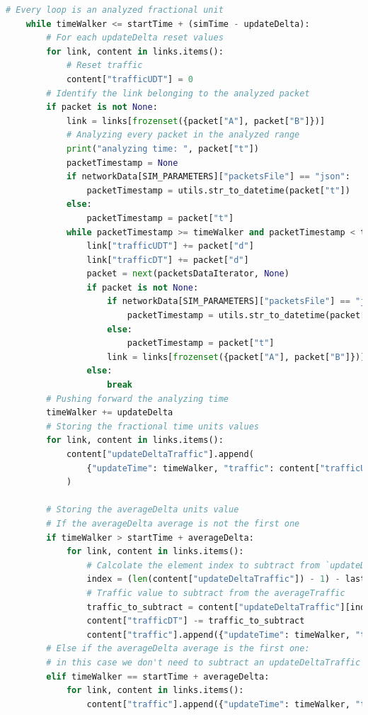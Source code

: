 \documentclass[binding=0.6cm]{sapthesis}
\begin{document}
{\scriptsize
\begin{lstlisting}[language=Python, basicstyle=\ttfamily, caption={Logica analisi pacchetti}, label={codice:analyze_packets}, breaklines=true]
    # Every loop is an analyzed fractional unit
    while timeWalker <= startTime + (simTime - updateDelta):
        # For each updateDelta reset values
        for link, content in links.items():
            # Reset traffic
            content["trafficUDT"] = 0
        # Identify the link belonging to the analyzed packet
        if packet is not None:
            link = links[frozenset({packet["A"], packet["B"]})]
            # Analyzing every packet in the analyzed range
            print("analyzing time: ", packet["t"])
            packetTimestamp = None
            if networkData[SIM_PARAMETERS]["packetsFile"] == "json":
                packetTimestamp = utils.str_to_datetime(packet["t"])
            else:
                packetTimestamp = packet["t"]
            while packetTimestamp >= timeWalker and packetTimestamp < timeWalker + updateDelta:
                link["trafficUDT"] += packet["d"]
                link["trafficDT"] += packet["d"]
                packet = next(packetsDataIterator, None)
                if packet is not None:
                    if networkData[SIM_PARAMETERS]["packetsFile"] == "json":
                        packetTimestamp = utils.str_to_datetime(packet["t"])
                    else:
                        packetTimestamp = packet["t"]
                    link = links[frozenset({packet["A"], packet["B"]})]
                else:
                    break
        # Pushing forward the analyzing time
        timeWalker += updateDelta
        # Storing the fractional time units values
        for link, content in links.items():
            content["updateDeltaTraffic"].append(
                {"updateTime": timeWalker, "traffic": content["trafficUDT"]}
            )
    
        # Storing the averageDelta units value
        # If the averageDelta average is not the first one
        if timeWalker > startTime + averageDelta:
            for link, content in links.items():
                # Calcolate the element index to subtract from `updateDeltaTraffic`
                index = (len(content["updateDeltaTraffic"]) - 1) - lastFirstUDindex
                # Traffic value to subtract from the averageTraffic
                traffic_to_subtract = content["updateDeltaTraffic"][index]["traffic"]
                content["trafficDT"] -= traffic_to_subtract
                content["traffic"].append({"updateTime": timeWalker, "traffic": content["trafficDT"]})
        # Else if the averageDelta average is the first one:
        # in this case we don't need to subtract an updateDeltaTraffic
        elif timeWalker == startTime + averageDelta:
            for link, content in links.items():
                content["traffic"].append({"updateTime": timeWalker, "traffic": content["trafficDT"]})
\end{lstlisting}
}
\end{document}
